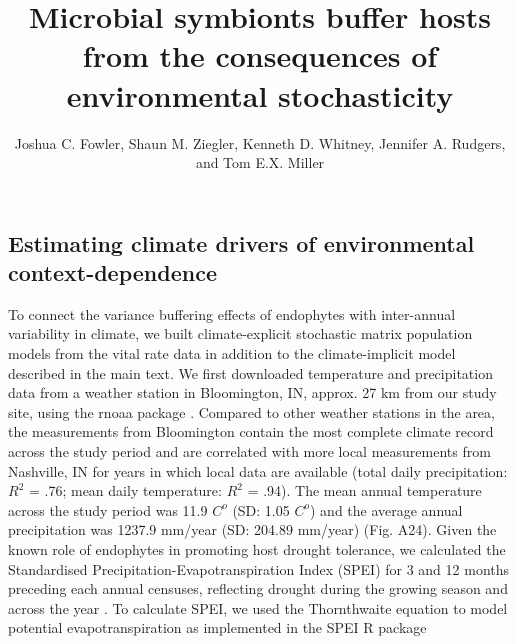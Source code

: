 \documentclass[9pt,twoside,lineno]{pnas-new}
\title{Microbial symbionts buffer hosts from the consequences of environmental stochasticity}
\author{Joshua C. Fowler, Shaun M. Ziegler, Kenneth D. Whitney, Jennifer A. Rudgers, and Tom E.X. Miller}
\begin{document}


\maketitle

\SItext


\subsection*{Estimating climate drivers of environmental context-dependence}
{
To connect the variance buffering effects of endophytes with inter-annual variability in climate, we built climate-explicit stochastic matrix population models from the vital rate data in addition to the climate-implicit model described in the main text.
We first downloaded temperature and precipitation data from a weather station in Bloomington, IN,  approx. 27 km from our study site, using the rnoaa package \cite{chamberlain2022package}. 
Compared to other weather stations in the area, the measurements from Bloomington contain the most complete climate record across the study period and are correlated with more local measurements from Nashville, IN for years in which local data are available (total daily precipitation: $R^2$ = .76; mean daily temperature: $R^2$ = .94).
The mean annual temperature across the study period was 11.9 $C^o $ (SD: 1.05 $C^o $) and the average annual precipitation was 1237.9 mm/year (SD: 204.89 mm/year) (Fig. A24).
Given the known role of endophytes in promoting host drought tolerance, we calculated the Standardised Precipitation-Evapotranspiration Index (SPEI) for 3 and 12 months preceding each annual censuses, reflecting drought during the growing season and across the year \cite{vicente2010multiscalar}.
To calculate SPEI, we used the Thornthwaite equation to model potential evapotranspiration as implemented in the SPEI R package \cite{begueria2013spei}

}
\end{document}
